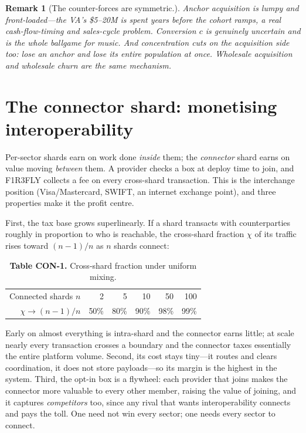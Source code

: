 \documentclass[11pt]{article}
\newtheorem{remark}{Remark}
\begin{document}
\begin{remark}[The counter-forces are symmetric.]
Anchor acquisition is lumpy and front-loaded---the VA's \$5--20M is spent years before the cohort ramps, a real cash-flow-timing and sales-cycle problem. Conversion $c$ is genuinely uncertain and is the whole ballgame for music. And concentration cuts on the acquisition side too: lose an anchor and lose its entire population at once. Wholesale acquisition and wholesale churn are the same mechanism.
\end{remark}

\section{The connector shard: monetising interoperability}
\label{sec:connector}

Per-sector shards earn on work done \emph{inside} them; the \emph{connector} shard earns on value moving \emph{between} them. A provider checks a box at deploy time to join, and F1R3FLY collects a fee on every cross-shard transaction. This is the interchange position (Visa/Mastercard, SWIFT, an internet exchange point), and three properties make it the profit centre.

First, the tax base grows superlinearly. If a shard transacts with counterparties roughly in proportion to who is reachable, the cross-shard fraction $\chi$ of its traffic rises toward $(n-1)/n$ as $n$ shards connect:

\begin{table}[h]
\centering
\caption*{\textbf{Table CON-1.} Cross-shard fraction under uniform mixing.}
\begin{tabular}{@{}rrrrrr@{}}
\toprule
Connected shards $n$ & 2 & 5 & 10 & 50 & 100 \\
$\chi \to (n-1)/n$ & 50\% & 80\% & 90\% & 98\% & 99\% \\
\bottomrule
\end{tabular}
\end{table}

Early on almost everything is intra-shard and the connector earns little; at scale nearly every transaction crosses a boundary and the connector taxes essentially the entire platform volume. Second, its cost stays tiny---it routes and clears coordination, it does not store payloads---so its margin is the highest in the system. Third, the opt-in box is a flywheel: each provider that joins makes the connector more valuable to every other member, raising the value of joining, and it captures \emph{competitors} too, since any rival that wants interoperability connects and pays the toll. One need not win every sector; one needs every sector to connect.
\end{document}
